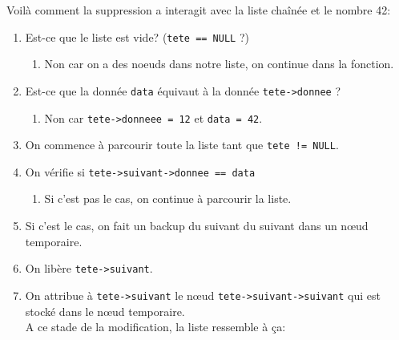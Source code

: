 \documentclass[11pt]{article}
\begin{document}
Voilà comment la suppression a interagit avec la liste chaînée et le nombre 42:
\begin{enumerate}
\item Est-ce que le liste est vide? (\texttt{tete == NULL} ?)
  \begin{enumerate}
  \item Non car on a des noeuds dans notre liste, on continue dans la fonction.
  \end{enumerate}
\item Est-ce que la donnée \texttt{data} équivaut à la donnée \texttt{tete->donnee} ?
  \begin{enumerate}
    \item Non car \texttt{tete->donneee = 12} et \texttt{data = 42}.
  \end{enumerate}
\item On commence à parcourir toute la liste tant que \texttt{tete != NULL}.
\item On vérifie si \texttt{tete->suivant->donnee == data}
  \begin{enumerate}
  \item Si c'est pas le cas, on continue à parcourir la liste.
  \end{enumerate}
\item Si c'est le cas, on fait un backup du suivant du suivant dans un n\oe{}ud temporaire.
\item On libère \texttt{tete->suivant}.
\item On attribue à \texttt{tete->suivant} le n\oe{}ud \texttt{tete->suivant->suivant} qui est stocké dans le n\oe{}ud temporaire.\\
A ce stade de la modification, la liste ressemble à ça:\\\\
\end{enumerate}
\end{document}

